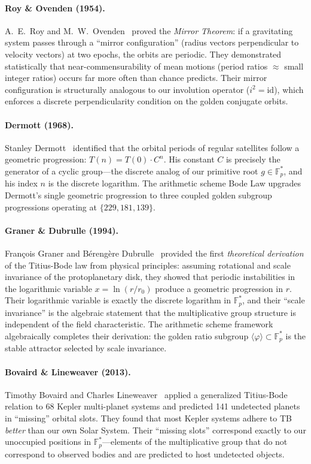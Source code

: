 \paragraph{Roy \& Ovenden (1954).}
A.~E.~Roy and M.~W.~Ovenden~\cite{roy1954} proved the \emph{Mirror Theorem}: if a gravitating system passes through a ``mirror configuration'' (radius vectors perpendicular to velocity vectors) at two epochs, the orbits are periodic. They demonstrated statistically that near-commensurability of mean motions (period ratios $\approx$ small integer ratios) occurs far more often than chance predicts. Their mirror configuration is structurally analogous to our involution operator ($i^2 = \mathrm{id}$), which enforces a discrete perpendicularity condition on the golden conjugate orbits.

\paragraph{Dermott (1968).}
Stanley Dermott~\cite{dermott1968} identified that the orbital periods of regular satellites follow a geometric progression: $T(n) = T(0) \cdot C^n$. His constant $C$ is precisely the generator of a cyclic group---the discrete analog of our primitive root $g \in \mathbb{F}_p^*$, and his index $n$ is the discrete logarithm. The arithmetic scheme Bode Law upgrades Dermott's single geometric progression to three coupled golden subgroup progressions operating at $\{229, 181, 139\}$.

\paragraph{Graner \& Dubrulle (1994).}
Fran\c{c}ois Graner and B\'{e}reng\`{e}re Dubrulle~\cite{graner1994} provided the first \emph{theoretical derivation} of the Titius-Bode law from physical principles: assuming rotational and scale invariance of the protoplanetary disk, they showed that periodic instabilities in the logarithmic variable $x = \ln(r/r_0)$ produce a geometric progression in $r$. Their logarithmic variable is exactly the discrete logarithm in $\mathbb{F}_p^*$, and their ``scale invariance'' is the algebraic statement that the multiplicative group structure is independent of the field characteristic. The arithmetic scheme framework algebraically completes their derivation: the golden ratio subgroup $\langle\varphi\rangle \subset \mathbb{F}_p^*$ is the stable attractor selected by scale invariance.

\paragraph{Bovaird \& Lineweaver (2013).}
Timothy Bovaird and Charles Lineweaver~\cite{bovaird2013} applied a generalized Titius-Bode relation to 68 Kepler multi-planet systems and predicted 141 undetected planets in ``missing'' orbital slots. They found that most Kepler systems adhere to TB \emph{better} than our own Solar System. Their ``missing slots'' correspond exactly to our unoccupied positions in $\mathbb{F}_p^*$---elements of the multiplicative group that do not correspond to observed bodies and are predicted to host undetected objects.

